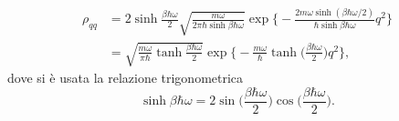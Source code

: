 \begin{ex}
    \begin{equation}
        \begin{split}
            \rho_{qq} &= 2\sinh{\frac{\beta\hbar\omega}{2}}\sqrt{\frac{m\omega}{2\pi\hbar\sinh{\beta\hbar\omega}}}\exp{\bigg\{-\frac{2m\omega\sinh{(\beta\hbar\omega/2)}}{\hbar\sinh{\beta\hbar\omega}}q^2\bigg\}} \\
            &= \sqrt{\frac{m\omega}{\pi\hbar}\tanh{\frac{\beta\hbar\omega}{2}}}\exp{\bigg\{-\frac{m\omega}{\hbar}\tanh{\bigg(\frac{\beta\hbar\omega}{2}\bigg)}q^2\bigg\}},
        \end{split}
    \end{equation}
    dove si è usata la relazione trigonometrica
    \begin{equation}
        \sinh{\beta\hbar\omega} = 2\sin{\bigg(\frac{\beta\hbar\omega}{2}\bigg)}\cos{\bigg(\frac{\beta\hbar\omega}{2}\bigg)}.
    \end{equation}
\end{ex}

